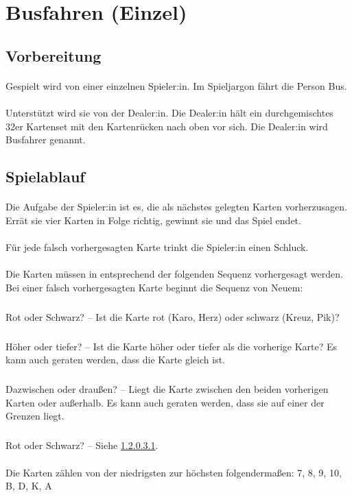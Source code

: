 \section{Busfahren (Einzel)} \label{Busfahren_solo}
\subsection{Vorbereitung}
\paragraph{}
Gespielt wird von einer einzelnen Spieler:in.
Im Spieljargon \glqq fährt die Person Bus\grqq{}.

\paragraph{}
Unterstützt wird sie von der Dealer:in.
Die Dealer:in hält ein durchgemischtes 32er Kartenset mit den Kartenrücken nach oben vor sich.
Die Dealer:in wird \glqq Busfahrer\grqq{} genannt.


\subsection{Spielablauf}
\paragraph{}
Die Aufgabe der Spieler:in ist es, die als nächstes gelegten Karten vorherzusagen.
Errät sie vier Karten in Folge richtig, gewinnt sie und das Spiel endet.

\paragraph{}
Für jede falsch vorhergesagten Karte trinkt die Spieler:in einen Schluck.

\paragraph{}
Die Karten müssen in entsprechend der folgenden Sequenz vorhergesagt werden.
Bei einer falsch vorhergesagten Karte beginnt die Sequenz von Neuem:
\subparagraph{} \label{Busfahren_solo:Spielablauf:Fragen:RS}
Rot oder Schwarz? – Ist die Karte rot (Karo, Herz) oder schwarz (Kreuz, Pik)?
\subparagraph{}
Höher oder tiefer? – Ist die Karte höher oder tiefer als die vorherige Karte?
Es kann auch geraten werden, dass die Karte gleich ist.
\subparagraph{}
Dazwischen oder draußen? – Liegt die Karte zwischen den beiden vorherigen Karten oder außerhalb.
Es kann auch geraten werden, dass sie auf einer der Grenzen liegt.
\subparagraph{}
Rot oder Schwarz? – Siehe \ref{Busfahren_solo:Spielablauf:Fragen:RS}.

\paragraph{}
Die Karten zählen von der niedrigsten zur höchsten folgendermaßen: 7, 8, 9, 10, B, D, K, A